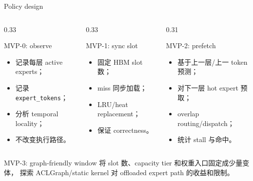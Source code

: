 \documentclass[aspectratio=169,10pt]{beamer}
\begin{document}
\begin{frame}[t]{Policy design}
\small
\vspace{-0.4em}

\begin{columns}[T,onlytextwidth]
\begin{column}{0.33\textwidth}
\begin{block}{MVP-0: observe}
\footnotesize
\begin{itemize}
  \item 记录每层 active experts；
  \item 记录 \texttt{expert\_tokens}；
  \item 分析 temporal locality；
  \item 不改变执行路径。
\end{itemize}
\end{block}
\end{column}

\begin{column}{0.33\textwidth}
\begin{block}{MVP-1: sync slot}
\footnotesize
\begin{itemize}
  \item 固定 HBM slot 数；
  \item miss 同步加载；
  \item LRU/heat replacement；
  \item 保证 correctness。
\end{itemize}
\end{block}
\end{column}

\begin{column}{0.31\textwidth}
\begin{block}{MVP-2: prefetch}
\footnotesize
\begin{itemize}
  \item 基于上一层/上一 token 预测；
  \item 对下一层 hot expert 预取；
  \item overlap routing/dispatch；
  \item 统计 stall 与命中。
\end{itemize}
\end{block}
\end{column}
\end{columns}

\vspace{0.75em}
\begin{block}{MVP-3: graph-friendly window}
\footnotesize
将 slot 数、capacity tier 和权重入口固定成少量变体，
探索 ACLGraph/static kernel 对 offloaded expert path 的收益和限制。
\end{block}
\end{frame}
\end{document}
